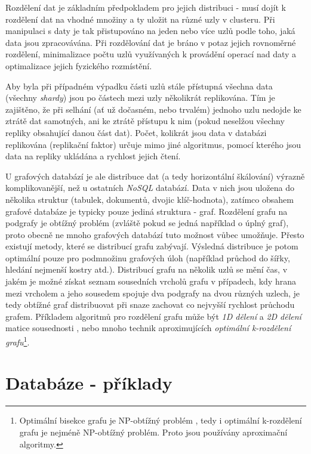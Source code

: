 Rozdělení dat je základním předpokladem pro jejich distribuci - musí dojít k rozdělení dat na vhodné množiny a ty uložit na různé uzly v clusteru. Při manipulaci s daty je tak přistupováno na jeden nebo více uzlů podle toho, jaká data jsou zpracovávána. Při rozdělování dat je bráno v potaz jejich rovnoměrné rozdělení, minimalizace počtu uzlů využívaných k provádění operací nad daty a optimalizace jejich fyzického rozmístění.

Aby byla při případném výpadku části uzlů stále přístupná všechna data (všechny \textit{shardy}) jsou po částech mezi uzly několikrát replikována. Tím je zajištěno, že při selhání (ať už dočasném, nebo trvalém) jednoho uzlu nedojde ke ztrátě dat samotných, ani ke ztrátě přístupu k nim (pokud neselžou všechny repliky obsahující danou část dat). Počet, kolikrát jsou data v databázi replikována (replikační faktor) určuje mimo jiné algoritmus, pomocí kterého jsou data na repliky ukládána a rychlost jejich čtení.

U grafových databází je ale distribuce dat (a tedy horizontální škálování) výrazně komplikovanější, než u ostatních \textit{NoSQL} databází. Data v nich jsou uložena do několika struktur (tabulek, dokumentů, dvojic klíč-hodnota), zatímco obsahem grafové databáze je typicky pouze jediná struktura - graf. Rozdělení grafu na podgrafy je obtížný problém (zvláště pokud se jedná například o úplný graf), proto obecně ne mnoho grafových databází tuto možnost vůbec umožňuje. Přesto existují metody, které se distribucí grafu zabývají. Výsledná distribuce je potom optimální pouze pro podmnožinu grafových úloh (například průchod do šířky, hledání nejmenší kostry atd.). Distribucí grafu na několik uzlů se mění čas, v jakém je možné získat seznam sousedních vrcholů grafu v případech, kdy hrana mezi vrcholem a jeho sousedem spojuje dva podgrafy na dvou různých uzlech, je tedy obtížné graf distribuovat při snaze zachovat co nejvyšší rychlost průchodu grafem. Příkladem algoritmů pro rozdělení grafu může být \textit{1D dělení} a \textit{2D dělení} matice sousednosti \cite{Yoo05}, nebo mnoho technik aproximujících \textit{optimální k-rozdělení grafu}\footnote{Optimální bisekce grafu je NP-obtížný problém \cite{Garey90}, tedy i optimální k-rozdělení grafu je nejméně NP-obtížný problém. Proto jsou používány aproximační algoritmy.}.\cite{George78} \cite{Fiduccia82} \cite{Battiti99}

\section{Databáze - příklady}
\label{sec:gdb-databaze}

